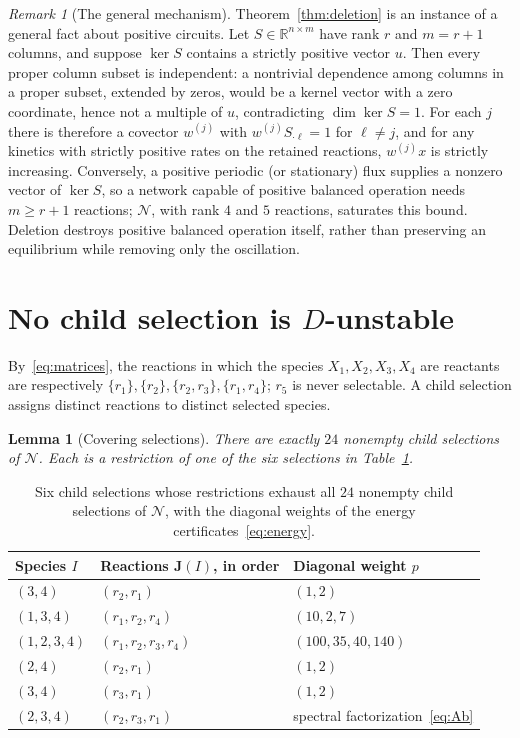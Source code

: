 \documentclass[11pt,a4paper]{article}
\theoremstyle{plain}
\newtheorem{lemma}[theorem]{Lemma}
\theoremstyle{definition}
\theoremstyle{remark}
\newtheorem{remark}[theorem]{Remark}
\newcommand{\R}{\mathbb{R}}
\newcommand{\Osc}{\mathcal{N}}
\begin{document}
\begin{remark}[The general mechanism]\label{rem:circuit}
Theorem~\ref{thm:deletion} is an instance of a general fact about positive circuits. Let $S\in\R^{n\times m}$ have rank $r$ and $m=r+1$ columns, and suppose $\ker S$ contains a strictly positive vector $u$. Then every proper column subset is independent: a nontrivial dependence among columns in a proper subset, extended by zeros, would be a kernel vector with a zero coordinate, hence not a multiple of $u$, contradicting $\dim\ker S=1$. For each $j$ there is therefore a covector $w^{(j)}$ with $w^{(j)}S_{\cdot\ell}=1$ for $\ell\ne j$, and for any kinetics with strictly positive rates on the retained reactions, $w^{(j)}x$ is strictly increasing. Conversely, a positive periodic (or stationary) flux supplies a nonzero vector of $\ker S$, so a network capable of positive balanced operation needs $m\ge r+1$ reactions; $\Osc$, with rank $4$ and $5$ reactions, saturates this bound. Deletion destroys positive balanced operation itself, rather than preserving an equilibrium while removing only the oscillation.
\end{remark}

\section{No child selection is $D$-unstable}\label{sec:children}

By~\eqref{eq:matrices}, the reactions in which the species $X_1,X_2,X_3,X_4$ are reactants are respectively $\{r_1\},\{r_2\},\{r_2,r_3\},\{r_1,r_4\}$; $r_5$ is never selectable. A child selection assigns distinct reactions to distinct selected species.

\begin{lemma}[Covering selections]\label{lem:cover}
There are exactly $24$ nonempty child selections of $\Osc$. Each is a restriction of one of the six selections in Table~\ref{tab:cover}.
\end{lemma}

\begin{table}[ht]
\centering
\begin{tabular}{lll}
\toprule
Species $I$ & Reactions $\mathbf J(I)$, in order & Diagonal weight $p$\\
\midrule
$(3,4)$ & $(r_2,r_1)$ & $(1,2)$\\
$(1,3,4)$ & $(r_1,r_2,r_4)$ & $(10,2,7)$\\
$(1,2,3,4)$ & $(r_1,r_2,r_3,r_4)$ & $(100,35,40,140)$\\
$(2,4)$ & $(r_2,r_1)$ & $(1,2)$\\
$(3,4)$ & $(r_3,r_1)$ & $(1,2)$\\
$(2,3,4)$ & $(r_2,r_3,r_1)$ & spectral factorization~\eqref{eq:Ab}\\
\bottomrule
\end{tabular}
\caption{Six child selections whose restrictions exhaust all $24$ nonempty child selections of $\Osc$, with the diagonal weights of the energy certificates~\eqref{eq:energy}.}
\label{tab:cover}
\end{table}
\end{document}
